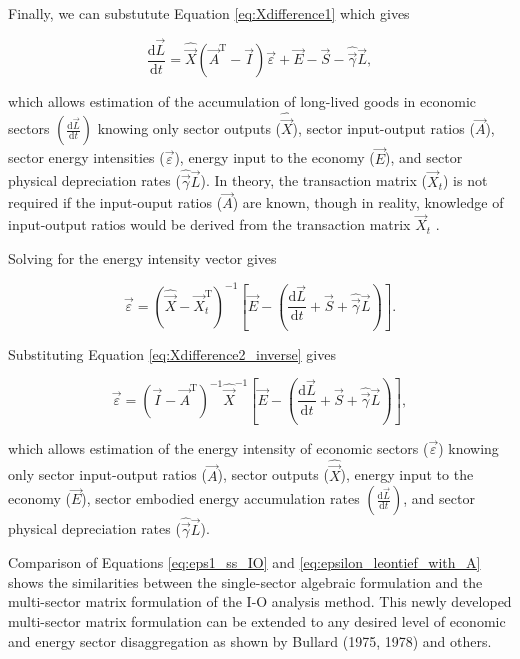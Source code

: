 \noindent Finally, we can substutute Equation \ref{eq:Xdifference1} which gives

\begin{equation} \label{eq:D-dB_dt_leontief_with_A}
	\frac{\mathrm{d}\vec{L}}{\mathrm{d}t} = \hat{\vec{X}} (\vec{A}^{\mathrm{T}} - \vec{I}) \vec{\varepsilon} + \vec{E} - \vec{S} - \hat{\vec{\gamma}}\vec{L},
\end{equation}

\noindent which allows estimation of the accumulation of long-lived goods in economic sectors $\left(\frac{\mathrm{d}\vec{L}}{\mathrm{d}t}\right)$ knowing only sector outputs ($\hat{\vec{X}}$), sector input-output ratios ($\vec{A}$), sector energy intensities ($\vec{\varepsilon}$), energy input to the economy ($\vec{E}$), and sector physical depreciation rates ($\hat{\vec{\gamma}}\vec{L}$). In theory, the transaction matrix ($\vec{X}_{t}$) is not required if the input-ouput ratios ($\vec{A}$) are known, though in reality, knowledge of input-output ratios would be derived from the transaction matrix $\vec{X}_{t}$ .

Solving for the energy intensity vector gives

\begin{equation} \label{eq:D-epsilon_leontief}
	\vec{\varepsilon} = (\hat{\vec{X}} - \vec{X}_{t}^{\mathrm{T}})^{-1}\left[\vec{E} - \left(\frac{\mathrm{d}\vec{L}}{\mathrm{d}t} + \vec{S} + \hat{\vec{\gamma}}\vec{L}\right)\right].
\end{equation}

\noindent Substituting Equation \ref{eq:Xdifference2_inverse} gives

\begin{equation} \label{eq:D-epsilon_leontief_with_A}
	\vec{\varepsilon} = (\vec{I} - \vec{A}^{\mathrm{T}})^{-1}\hat{\vec{X}}^{-1}\left[\vec{E} - \left(\frac{\mathrm{d}\vec{L}}{\mathrm{d}t} + \vec{S} + \hat{\vec{\gamma}}\vec{L}\right)\right],
\end{equation}

\noindent which allows estimation of the energy intensity of economic sectors ($\vec{\varepsilon}$) knowing only sector input-output ratios ($\vec{A}$), sector outputs ($\hat{\vec{X}}$), energy input to the economy ($\vec{E}$), sector embodied energy accumulation rates $\left(\frac{\mathrm{d}\vec{L}}{\mathrm{d}t}\right)$, and sector physical depreciation rates ($\hat{\vec{\gamma}}\vec{L}$).

Comparison of Equations \ref{eq:eps1_ss_IO} and \ref{eq:epsilon_leontief_with_A} shows the similarities between the single-sector algebraic formulation and the multi-sector matrix formulation of the I-O analysis method. This newly developed multi-sector matrix formulation can be extended to any desired level of economic and energy sector disaggregation as shown by Bullard (1975, 1978) and others.


